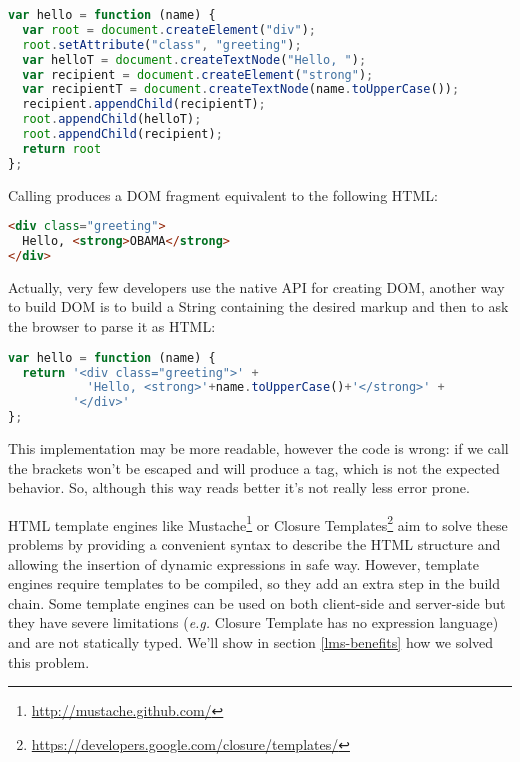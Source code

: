 \documentclass[american,english,runningheads]{llncs}
\newcommand{\eg}{\emph{e.g.}}
\begin{document}
\begin{lstlisting}[language=JavaScript,label=dom-api,caption=DOM fragment creation using the native API]
var hello = function (name) {
  var root = document.createElement("div");
  root.setAttribute("class", "greeting");
  var helloT = document.createTextNode("Hello, ");
  var recipient = document.createElement("strong");
  var recipientT = document.createTextNode(name.toUpperCase());
  recipient.appendChild(recipientT);
  root.appendChild(helloT);
  root.appendChild(recipient);
  return root
};
\end{lstlisting}

Calling  produces a DOM fragment equivalent to the following HTML:

\begin{lstlisting}[language=HTML]
<div class="greeting">
  Hello, <strong>OBAMA</strong>
</div>
\end{lstlisting}

Actually, very few developers use the native API for creating DOM, another way to build DOM is to build a String containing the desired markup and then to ask the browser to parse it as HTML:

\begin{lstlisting}[language=JavaScript]
var hello = function (name) {
  return '<div class="greeting">' +
           'Hello, <strong>'+name.toUpperCase()+'</strong>' +
         '</div>'
};
\end{lstlisting}

This implementation may be more readable, however the code is wrong: if we call  the brackets won’t be escaped and will produce a  tag, which is not the expected behavior. So, although this way reads better it’s not really less error prone.

HTML template engines like Mustache\footnote{\href{http://mustache.github.com/}{http://mustache.github.com/}} or Closure Templates\footnote{\href{https://developers.google.com/closure/templates/}{https://developers.google.com/closure/templates/}} aim to solve these problems by providing a convenient syntax to describe the HTML structure and allowing the insertion of dynamic expressions in safe way. However, template engines require templates to be compiled, so they add an extra step in the build chain. Some template engines can be used on both client-side and server-side but they have severe limitations (\eg{} Closure Template has no expression language) and are not statically typed. We’ll show in section \ref{lms-benefits} how we solved this problem.
\end{document}
